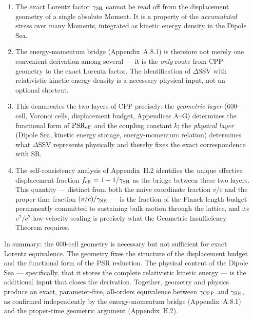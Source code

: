 \documentclass[11pt,letterpaper]{article}
\begin{document}
\begin{enumerate}
\item The exact Lorentz factor $\gamma_{\rm SR}$ cannot be read off from the displacement geometry of a single absolute Moment. It is a property of the \emph{accumulated} stress over many Moments, integrated as kinetic energy density in the Dipole Sea.

\item The energy-momentum bridge (Appendix~A.8.1) is therefore not merely one convenient derivation among several — it is the \emph{only} route from CPP geometry to the exact Lorentz factor. The identification of $\Delta\text{SSV}$ with relativistic kinetic energy density is a necessary physical input, not an optional shortcut.

\item This demarcates the two layers of CPP precisely: the 
\emph{geometric layer} (600-cell, Voronoi cells, displacement budget, Appendices A--G) determines the functional form of $\text{PSR}_{\rm eff}$ and the coupling constant $k$; the \emph{physical layer} (Dipole Sea, kinetic energy storage, energy-momentum relation) determines what $\Delta\text{SSV}$ represents physically and thereby fixes the exact correspondence with SR.

\item The self-consistency analysis of Appendix~H.2 identifies the unique effective displacement fraction $f_{\rm eff} = 1 - 1/\gamma_{\rm SR}$ as the bridge between these two layers. This quantity — distinct from both the naive coordinate fraction $v/c$ and the proper-time fraction $(v/c)/\gamma_{\rm SR}$ — is the fraction of the Planck-length budget permanently committed to sustaining bulk motion through the lattice, and its $v^2/c^2$ low-velocity scaling is precisely what the Geometric Insufficiency Theorem requires.
\end{enumerate}

In summary: the 600-cell geometry is necessary but not sufficient for exact Lorentz equivalence. The geometry fixes the structure of the displacement budget and the functional form of the PSR reduction. The physical content of the Dipole Sea — specifically, that it stores the complete relativistic kinetic energy — is the additional input that closes the derivation. Together, geometry and physics produce an exact, 
parameter-free, all-orders equivalence between $\gamma_{\rm CPP}$ and $\gamma_{\rm SR}$, as confirmed independently by the energy-momentum bridge (Appendix~A.8.1) and the proper-time geometric argument (Appendix~H.2).
\end{document}
